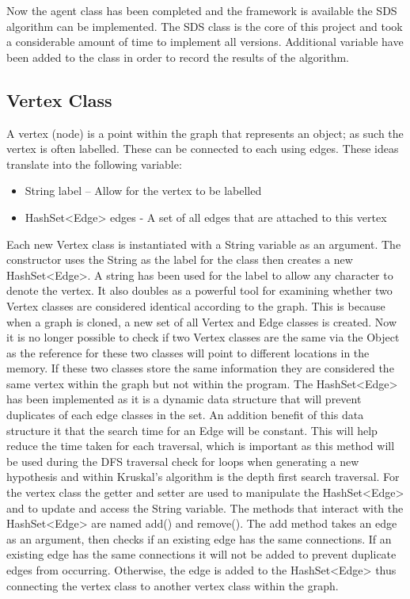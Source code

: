 \documentclass{AISB2008}
\begin{document}
Now the agent class has been completed and the framework is available the SDS algorithm can be implemented. The SDS class is the core of this project and took a considerable amount of time to implement all versions.  Additional variable have been added to the class in order to record the results of the algorithm.


\subsection{Vertex Class}

A vertex (node) is a point within the graph that represents an object; as such the vertex is often labelled. These can be connected to each using edges. These ideas translate into the following variable:

\begin{itemize}
\item String label – Allow for the vertex to be labelled
\item HashSet<Edge> edges - A set of all edges that are attached to this vertex
\end{itemize}
Each new Vertex class is instantiated with a String variable as an argument. The constructor uses the String as the label for the class then creates a new HashSet<Edge>. A string has been used for the label to allow any character to denote the vertex. It also doubles as a powerful tool for examining whether two Vertex classes are considered identical according to the graph. This is because when a graph is cloned, a new set of all Vertex and Edge classes is created. Now it is no longer possible to check if two Vertex classes are the same via the Object as the reference for these two classes will point to different locations in the memory. If these two classes store the same information they are considered the same vertex within the graph but not within the program.
The HashSet<Edge> has been implemented as it is a dynamic data structure that will prevent duplicates of each edge classes in the set. An addition benefit of this data structure it that the search time for an Edge will be constant. This will help reduce the time taken for each traversal, which is important as this method will be used during the DFS traversal check for loops when generating a new hypothesis and within Kruskal’s algorithm is the depth first search traversal.
For the vertex class the getter and setter are used to manipulate the HashSet<Edge> and to update and access the String variable. The methods that interact with the HashSet<Edge> are named add() and remove(). The add method takes an edge as an argument, then checks if an existing edge has the same connections. If an existing edge has the same connections it will not be added to prevent duplicate edges from occurring. Otherwise, the edge is added to the HashSet<Edge> thus connecting the vertex class to another vertex class within the graph.
\end{document}
